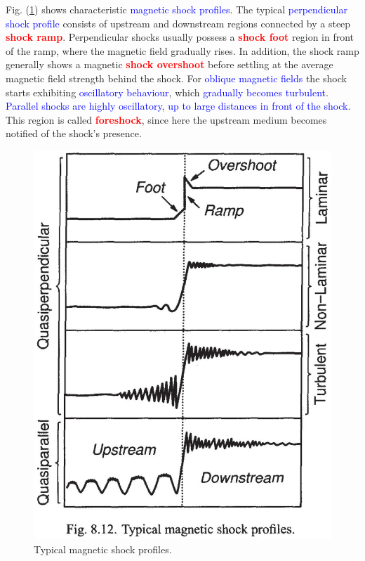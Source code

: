 \documentclass[12pt,a4paper]{article}
\begin{document}
Fig. (\ref{fig:shock_profile}) shows characteristic \textcolor{blue}{magnetic shock profiles}. The typical \textcolor{blue}{perpendicular shock profile} consists of upstream and downstream regions connected by a steep \textcolor{red}{\bf shock ramp}. Perpendicular shocks usually possess a \textcolor{red}{\bf shock foot} region in front of the ramp, where the magnetic field gradually rises. In addition, the shock ramp generally shows a magnetic \textcolor{red}{\bf shock overshoot} before settling at the average magnetic field strength behind the shock. For \textcolor{blue}{oblique magnetic fields} the shock starts exhibiting \textcolor{blue}{oscillatory behaviour}, which \textcolor{blue}{gradually becomes turbulent}. \textcolor{blue}{Parallel shocks are highly oscillatory, up to large distances in front of the shock}. This region is called \textcolor{red}{\bf foreshock}, since here the upstream medium becomes notified of the shock's presence.


\begin{figure}
\centering
\includegraphics[height=10.cm,angle=0]{shock_profile.eps}
\caption{
Typical magnetic shock profiles.
} 
\label{fig:shock_profile}
\end{figure}
\end{document}
